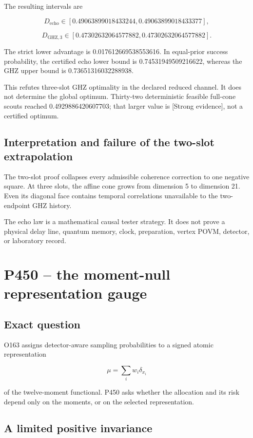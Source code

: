 \documentclass[11pt,a4paper,openany]{report}
\newcommand{\statusStrong}{\textcolor{finblue}{[Strong evidence]}}
\begin{document}
The resulting intervals are

\[
D_{\mathrm{echo}}
\in[0.49063899018433244,
0.49063899018433377],
\]

\[
D_{\mathrm{GHZ},3}
\in[0.47302632064577882,
0.47302632064577882].
\]

The strict lower advantage is 0.017612669538553616. In equal-prior success probability, the certified echo lower bound is 0.74531949509216622, whereas the GHZ upper bound is 0.73651316032288938.

This refutes three-slot GHZ optimality in the declared reduced channel. It does not determine the global optimum. Thirty-two deterministic feasible full-cone scouts reached 0.4929886420607703; that larger value is \statusStrong{}, not a certified optimum.

\section{Interpretation and failure of the two-slot extrapolation}

The two-slot proof collapses every admissible coherence correction to one negative square. At three slots, the affine cone grows from dimension 5 to dimension 21. Even its diagonal face contains temporal correlations unavailable to the two-endpoint GHZ history.

The echo law is a mathematical causal tester strategy. It does not prove a physical delay line, quantum memory, clock, preparation, vertex POVM, detector, or laboratory record.

\chapter{P450 -- the moment-null representation gauge}

\section{Exact question}

O163 assigns detector-aware sampling probabilities to a signed atomic representation

\[
\mu=\sum_iw_i\delta_{x_i}
\]

of the twelve-moment functional. P450 asks whether the allocation and its risk depend only on the moments, or on the selected representation.

\section{A limited positive invariance}
\end{document}
